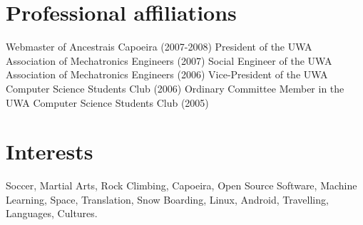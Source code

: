 \documentclass[10pt, a4paper]{report}
\begin{document}
%


\section*{Professional affiliations}
Webmaster of Ancestrais Capoeira (2007-2008) \newline
President of the UWA Association of Mechatronics Engineers (2007) \newline
Social Engineer of the UWA Association of Mechatronics Engineers (2006) \newline
Vice-President of the UWA Computer Science Students Club (2006) \newline
Ordinary Committee Member in the UWA Computer Science Students Club (2005) \newline

\section*{Interests}
{\large Soccer, Martial Arts, Rock Climbing, Capoeira, Open Source Software, Machine Learning, Space, Translation, Snow Boarding, Linux, Android, Travelling, Languages, Cultures.}
\end{document}
